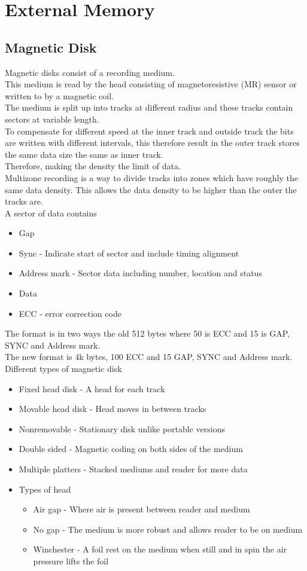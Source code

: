 \documentclass[12pt, a4paper]{article}
\begin{document}
	\section{External Memory}
		\subsection{Magnetic Disk}
			Magnetic disks consist of a recording medium.\\
			This medium is read by the head consisting of magnetoresistive (MR) sensor or written to by a magnetic coil.\\
			The medium is split up into tracks at different radius and these tracks contain sectors at variable length.\\
			To compensate for different speed at the inner track and outside track the bits are written with different intervals, this therefore result in the outer track stores the same data size the same as inner track.\\
			Therefore, making the density the limit of data.\\
			Multizone recording is a way to divide tracks into zones which have roughly the same data density. This allows the data density to be higher than the outer the tracks are.\\
			A sector of data contains
			\begin{itemize}
				\item Gap 
				\item Sync - Indicate start of sector and include timing alignment
				\item Address mark - Sector data including number, location and status
				\item Data
				\item ECC - error correction code
			\end{itemize}
			The format is in two ways the old 512 bytes where 50 is ECC and 15 is GAP, SYNC and Address mark.\\
			The new format is 4k bytes, 100 ECC and 15 GAP, SYNC and Address mark.\\
			Different types of magnetic disk
			\begin{itemize}
				\item Fixed head disk - A head for each track
				\item Movable head disk - Head moves in between tracks
				\item Nonremovable - Stationary disk unlike portable versions
				\item Double sided - Magnetic coding on both sides of the medium
				\item Multiple platters - Stacked mediums and reader for more data
				\item Types of head
				\begin{itemize}
					\item Air gap - Where air is present between reader and medium
					\item No gap - The medium is more robust and allows reader to be on medium
					\item Winchester - A foil rest on the medium when still and in spin the air pressure lifts the foil
				\end{itemize}
			\end{itemize}
\end{document}
